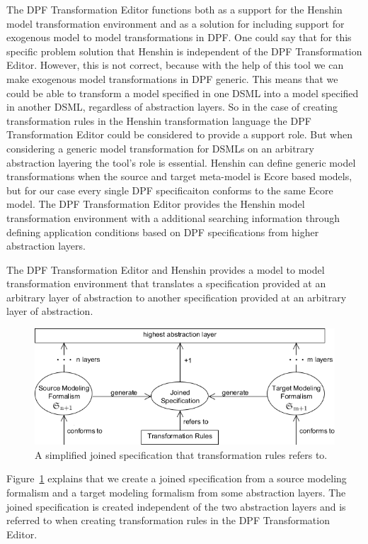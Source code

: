 The DPF Transformation Editor functions both as a support for the Henshin model
transformation environment and as a solution for including support for exogenous
model to model transformations in DPF. One could say that for this specific
problem solution that Henshin is independent of the DPF Transformation Editor.
However, this is not correct, because with the help of this tool we can make
exogenous model transformations in DPF generic. This means that we could be able
to transform a model specified in one DSML into a model specified in another
DSML, regardless of abstraction layers. So in the case of creating
transformation rules in the Henshin transformation language the DPF
Transformation Editor could be considered to provide a support role. But when
considering a generic model transformation for DSMLs on an arbitrary abstraction
layering the tool's role is essential. Henshin can define generic model
transformations when the source and target meta-model is Ecore based models, but
for our case every single DPF specificaiton conforms to the same Ecore model.
The DPF Transformation Editor provides the Henshin model transformation
environment with a additional searching information through defining application
conditions based on DPF specifications from higher abstraction layers. 

The DPF Transformation Editor and Henshin provides a model to model
transformation environment that translates a specification provided at an
arbitrary layer of abstraction to another specification provided at an arbitrary
layer of abstraction.

\begin{figure}[H]
	\centering
	\includegraphics[scale=0.7]{./Figures/simple_modeling_formalism.png}
	\caption[Simplified joined specification]
	{A simplified joined specification that transformation rules refers to.}
	\label{fig:simple_modeling_formalism}
\end{figure}

Figure~\ref{fig:simple_modeling_formalism} explains that we create a joined
specification from a source modeling formalism and a target modeling formalism
from some abstraction layers. The joined specification is created independent of
the two abstraction layers and is referred to when creating transformation rules
in the DPF Transformation Editor. 


